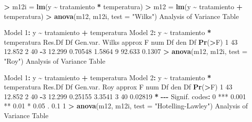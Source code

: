\documentclass[
  a4paper,
  oneside]{scrbook}
\newenvironment{Shaded}{\begin{snugshade}}{\end{snugshade}}
\newcommand{\AttributeTok}[1]{\textcolor[rgb]{0.13,0.29,0.53}{#1}}
\newcommand{\DecValTok}[1]{\textcolor[rgb]{0.00,0.00,0.81}{#1}}
\newcommand{\FloatTok}[1]{\textcolor[rgb]{0.00,0.00,0.81}{#1}}
\newcommand{\FunctionTok}[1]{\textcolor[rgb]{0.13,0.29,0.53}{\textbf{#1}}}
\newcommand{\NormalTok}[1]{#1}
\newcommand{\OtherTok}[1]{\textcolor[rgb]{0.56,0.35,0.01}{#1}}
\newcommand{\SpecialCharTok}[1]{\textcolor[rgb]{0.81,0.36,0.00}{\textbf{#1}}}
\newcommand{\StringTok}[1]{\textcolor[rgb]{0.31,0.60,0.02}{#1}}
\theoremstyle{definition}
\theoremstyle{definition}
\theoremstyle{definition}
\theoremstyle{definition}
\theoremstyle{remark}
\begin{document}
\begin{Shaded}
\begin{Highlighting}[]
\SpecialCharTok{\textgreater{}}\NormalTok{ m12i }\OtherTok{=} \FunctionTok{lm}\NormalTok{(y }\SpecialCharTok{\textasciitilde{}}\NormalTok{ tratamiento }\SpecialCharTok{*}\NormalTok{ temperatura)}
\SpecialCharTok{\textgreater{}}\NormalTok{ m12 }\OtherTok{=} \FunctionTok{lm}\NormalTok{(y }\SpecialCharTok{\textasciitilde{}}\NormalTok{ tratamiento }\SpecialCharTok{+}\NormalTok{ temperatura)}
\SpecialCharTok{\textgreater{}} \FunctionTok{anova}\NormalTok{(m12, m12i, }\AttributeTok{test =} \StringTok{"Wilks"}\NormalTok{)}
\NormalTok{Analysis of Variance Table}

\NormalTok{Model }\DecValTok{1}\SpecialCharTok{:}\NormalTok{ y }\SpecialCharTok{\textasciitilde{}}\NormalTok{ tratamiento }\SpecialCharTok{+}\NormalTok{ temperatura}
\NormalTok{Model }\DecValTok{2}\SpecialCharTok{:}\NormalTok{ y }\SpecialCharTok{\textasciitilde{}}\NormalTok{ tratamiento }\SpecialCharTok{*}\NormalTok{ temperatura}
\NormalTok{  Res.Df Df Gen.var.   Wilks approx F num Df den Df }\FunctionTok{Pr}\NormalTok{(}\SpecialCharTok{\textgreater{}}\NormalTok{F)}
\DecValTok{1}     \DecValTok{43}      \FloatTok{12.852}                                      
\DecValTok{2}     \DecValTok{40} \SpecialCharTok{{-}}\DecValTok{3}   \FloatTok{12.299} \FloatTok{0.70548}   \FloatTok{1.5864}      \DecValTok{9} \FloatTok{92.633} \FloatTok{0.1307}
\SpecialCharTok{\textgreater{}} \FunctionTok{anova}\NormalTok{(m12, m12i, }\AttributeTok{test =} \StringTok{"Roy"}\NormalTok{)}
\NormalTok{Analysis of Variance Table}

\NormalTok{Model }\DecValTok{1}\SpecialCharTok{:}\NormalTok{ y }\SpecialCharTok{\textasciitilde{}}\NormalTok{ tratamiento }\SpecialCharTok{+}\NormalTok{ temperatura}
\NormalTok{Model }\DecValTok{2}\SpecialCharTok{:}\NormalTok{ y }\SpecialCharTok{\textasciitilde{}}\NormalTok{ tratamiento }\SpecialCharTok{*}\NormalTok{ temperatura}
\NormalTok{  Res.Df Df Gen.var.     Roy approx F num Df den Df  }\FunctionTok{Pr}\NormalTok{(}\SpecialCharTok{\textgreater{}}\NormalTok{F)  }
\DecValTok{1}     \DecValTok{43}      \FloatTok{12.852}                                         
\DecValTok{2}     \DecValTok{40} \SpecialCharTok{{-}}\DecValTok{3}   \FloatTok{12.299} \FloatTok{0.25155}   \FloatTok{3.3541}      \DecValTok{3}     \DecValTok{40} \FloatTok{0.02819} \SpecialCharTok{*}
\SpecialCharTok{{-}{-}{-}}
\NormalTok{Signif. codes}\SpecialCharTok{:}  \DecValTok{0} \StringTok{\textquotesingle{}***\textquotesingle{}} \FloatTok{0.001} \StringTok{\textquotesingle{}**\textquotesingle{}} \FloatTok{0.01} \StringTok{\textquotesingle{}*\textquotesingle{}} \FloatTok{0.05} \StringTok{\textquotesingle{}.\textquotesingle{}} \FloatTok{0.1} \StringTok{\textquotesingle{} \textquotesingle{}} \DecValTok{1}
\SpecialCharTok{\textgreater{}} \FunctionTok{anova}\NormalTok{(m12, m12i, }\AttributeTok{test =} \StringTok{"Hotelling{-}Lawley"}\NormalTok{)}
\NormalTok{Analysis of Variance Table}


\end{Highlighting}
\end{Shaded}
\end{document}
